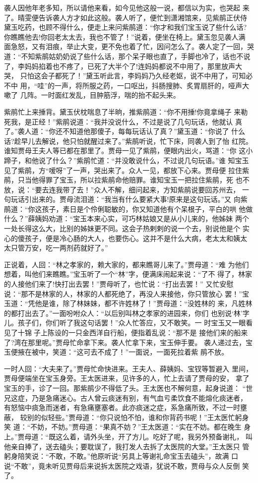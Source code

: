 袭人因他年老多知，所以请他来看，如今见他这般一说，都信以为实，也哭起
来了。晴雯便告诉袭人方才如此这般。袭人听了，便忙到潇湘馆来，见紫鹃正伏侍
黛玉吃药，也顾不得什么，便走上来问紫鹃道：“你才和我们宝玉说了些什么话?
你瞧瞧他去!你回老太太去，我也不管了！”说着，便坐在椅上。黛玉忽见袭人满
面急怒，又有泪痕，举止大变，更不免也着了忙，因问怎么了。袭人定了一回，哭
道：“不知紫鹃姑奶奶说了些什么话，那个呆子眼也直了，手脚也冷了，话也不说
了，李妈妈掐着也不疼了，已死了大半个了!连妈妈都说不中用了，那里放声大哭，
只怕这会子都死了！”黛玉听此言，李妈妈乃久经老妪，说不中用了，可知必不中
用，“哇”的一声，将所服之药，一口呕出，抖肠搜肺、炙胃扇肝的，哑声大嗽了
几阵。一时面红发乱，目肿筋浮，喘的抬不起头来。

紫鹃忙上来捶背。黛玉伏枕喘息了半晌，推紫鹃道：“你不用捶!你竟拿绳子
来勒死我，是正经！”紫鹃说道：“我并没说什么，不过是说了几句玩话，他就认
真了。”袭人道：“你还不知道他那傻子，每每玩话认了真？”黛玉道：“你说了
什么话?趁早儿去解说，他只怕就醒过来了。”紫鹃听说，忙下床，同袭人到了怡
红院。谁知贾母王夫人等已都在那里了。贾母一见了紫鹃，便眼内出火，骂道：“你
这小蹄子，和他说了什么？”紫鹃忙道：“并没敢说什么，不过说几句玩语。”谁
知宝玉见了紫鹃，方“嗳呀”了一声，哭出来了。众人一见，都放下心来。贾母便
拉住紫鹃，只当他得罪了宝玉，所以拉紫鹃命他赔罪。谁知宝玉一把拉住紫鹃，死
也不放，说：“要去连我带了去！”众人不解，细问起来，方知紫鹃说要回苏州去，
一句玩话引出来的。贾母流泪道：“我当有什么要紧大事!原来是这句玩话。”又
向紫鹃道：“你这孩子，素日是个伶俐聪敏的，你又知道他有个呆根子，平白的哄
他做什么？”薛姨妈劝道：“宝玉本来心实，可巧林姑娘又是从小儿来的，他姊妹
两个一处长得这么大，比别的姊妹更不同。这会子热剌剌的说一个去，别说他是个
实心的傻孩子，便是冷心肠的大人，也要伤心。这并不是什么大病，老太太和姨太
太只管万安，吃一两剂药就好了。”

正说着，人回：“林之孝家的，赖大家的，都来瞧哥儿来了。”贾母道：“难
为他们想着，叫他们来瞧瞧。”宝玉听了一个“林”字，便满床闹起来说：“了不
得了，林家的人接他们来了!快打出去罢！”贾母听了，也忙说：“打出去罢！”
又忙安慰说：“那不是林家的人，林家的人都死绝了，再没人来接他，你只管放心
罢！”宝玉道：“凭他是谁，除了林妹妹，都不许姓林了！”贾母道：“没姓林的
来，凡姓林的都打出去了。”一面吩咐众人：“以后别叫林之孝家的进园来，你们
也别说‘林’字儿。孩子们，你们听了我这句话罢！”众人忙答应，又不敢笑。一
时宝玉又一眼看见了十锦子上陈设的一只金西洋自行船，便指着乱说：“那不是
接他们来的船来了?湾在那里呢。”贾母忙命拿下来。袭人忙拿下来，宝玉伸手要。
袭人递过去，宝玉便掖在被中，笑道：“这可去不成了！”一面说，一面死拉着紫
鹃不放。

一时人回：“大夫来了。”贾母忙命快进来。王夫人、薛姨妈、宝钗等暂避入
里间，贾母便端坐在宝玉身旁。王太医进来，见许多的人，忙上去请了贾母的安，
拿了宝玉的手，诊了一回。那紫鹃少不得低了头。王太医也不解何意，起身说道：
“世兄这症，乃是急痛迷心。古人曾云痰迷有别，有气血亏柔饮食不能熔化痰迷者，
有怒恼中痰急而迷者，有急痛壅塞者。此亦痰迷之症，系急痛所致，不过一时壅蔽，
较别的似轻些。”贾母道：“你只说怕不怕，谁和你背药书呢！”王太医忙躬身笑
道：“不妨，不妨。”贾母道：“果真不妨？”王太医道：“实在不妨。都在晚生
身上。”贾母道：“既这么着，请外头坐，开了方儿。吃好了呢，我另外预备谢礼，
叫他亲自捧了，送去磕头；要耽误了，我打发人去拆了太医院的大堂。”王太医只
管躬身陪笑说：“不敢，不敢。”他原听说“另具上等谢礼命宝玉去磕头”，故满
口说“不敢”，竟未听见贾母后来说拆太医院之戏语，犹说不敢，贾母与众人反倒
笑了。


